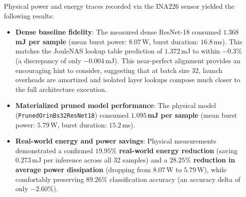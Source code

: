 Physical power and energy traces recorded via the INA226 sensor yielded the following results:
\begin{itemize}
    \item \textbf{Dense baseline fidelity}: The measured dense ResNet-18 consumed \textbf{$1.368$\,mJ per sample} (mean burst power: $8.07$\,W, burst duration: $16.8$\,ms). This matches the JouleNAS lookup table prediction of $1.372$\,mJ to within \textbf{$-0.3\%$} (a discrepancy of only $-0.004$\,mJ). This near-perfect alignment provides an encouraging hint to consider, suggesting that at batch size 32, launch overheads are amortized and isolated layer lookups compose much closer to the full architecture execution.
    \item \textbf{Materialized pruned model performance}: The physical model (\texttt{PrunedOrin\-Bs32\-ResNet18}) consumed \textbf{$1.095$\,mJ per sample} (mean burst power: $5.79$\,W, burst duration: $15.2$\,ms).
    \item \textbf{Real-world energy and power savings}: Physical measurements demonstrated a confirmed \textbf{$19.95\%$ real-world energy reduction} (saving $0.273$\,mJ per inference across all 32 samples) and a \textbf{$28.25\%$ reduction in average power dissipation} (dropping from $8.07$\,W to $5.79$\,W), while comfortably preserving $89.26\%$ classification accuracy (an accuracy delta of only $-2.60\%$).
\end{itemize}

